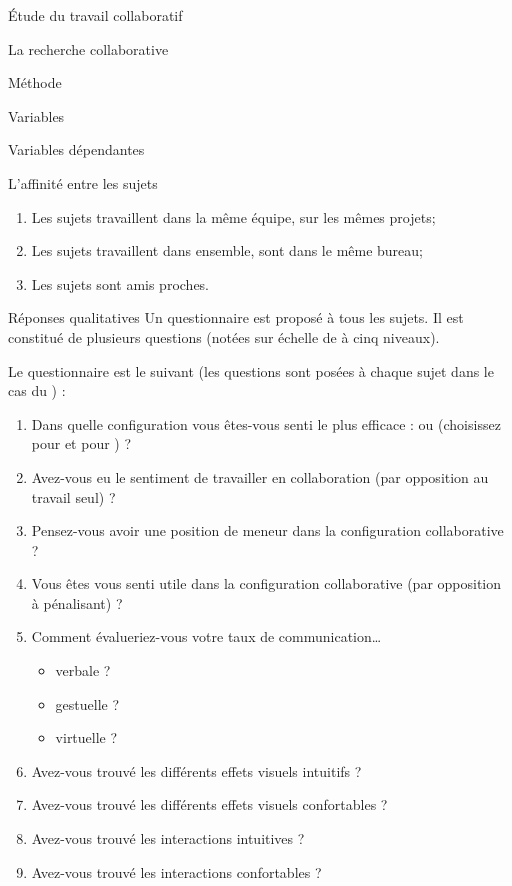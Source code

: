 \documentclass[myfrancais]{mythesis}
\begin{document}
\begin{mypart}{Étude du travail collaboratif}
\begin{mychapter}{La recherche collaborative}
\begin{mysection}{Méthode}
\begin{mysubsection}{Variables}
\begin{mysubsubsection}{Variables dépendantes}
\begin{myparagraph}{ L'affinité entre les sujets}
\begin{enumerate}
								\item Les sujets travaillent dans la même équipe, sur les mêmes projets;
								\item Les sujets travaillent dans ensemble, sont dans le même bureau;
								\item Les sujets sont amis proches.
							\end{enumerate}
						\end{myparagraph}
						\begin{myparagraph}{ Réponses qualitatives}
							Un questionnaire est proposé à tous les sujets.
							Il est constitué de plusieurs questions (notées sur échelle de  à cinq niveaux).

							Le questionnaire est le suivant (les questions sont posées à chaque sujet dans le cas du ) :
							\begin{enumerate}
								\item Dans quelle configuration vous êtes-vous senti le plus efficace :  ou  (choisissez  pour  et  pour ) ?
								\item Avez-vous eu le sentiment de travailler en collaboration (par opposition au travail seul) ?
								\item Pensez-vous avoir une position de meneur dans la configuration collaborative ?
								\item Vous êtes vous senti utile dans la configuration collaborative (par opposition à pénalisant) ?
								\item Comment évalueriez-vous votre taux de communication\dots{}
									\begin{itemize}
										\item verbale ?
										\item gestuelle ?
										\item virtuelle ?
									\end{itemize}
								\item Avez-vous trouvé les différents effets visuels intuitifs ?
								\item Avez-vous trouvé les différents effets visuels confortables ?
								\item Avez-vous trouvé les interactions intuitives ?
								\item Avez-vous trouvé les interactions confortables ?
							\end{enumerate}


\end{myparagraph}
\end{mysubsubsection}
\end{mysubsection}
\end{mysection}
\end{mychapter}
\end{mypart}
\end{document}
